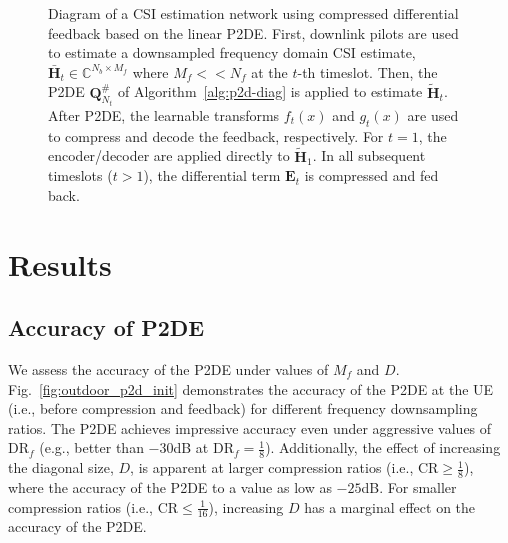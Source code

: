 \begin{figure}[!hbtp]
    \centering
    {
      \fontsize{8pt}{8pt}
      \def\svgwidth{1.0\linewidth}
      
    }
    \caption{Diagram of a CSI estimation network using compressed differential feedback based on the linear P2DE. First, downlink pilots are used to estimate a downsampled frequency domain CSI estimate, $\bar{\mathbf{H}}_t\in\mathbb{C}^{N_b \times M_f}$ where $M_f << N_f$ at the $t$-th timeslot. Then, the P2DE $\mathbf{Q}^\#_{N_t}$ of Algorithm~\ref{alg:p2d-diag} is applied to estimate $\tilde{\mathbf{H}}_t$. After P2DE, the learnable transforms $f_t(x)$ and $g_t(x)$ are used to compress and decode the feedback, respectively. For $t=1$, the encoder/decoder are applied directly to $\tilde{\mathbf{H}}_1$. In all subsequent timeslots ($t > 1$), the differential term $\mathbf{E}_t$ is compressed and fed back.}
    \label{fig:markov-p2d}
\end{figure}

\section{Results}
\label{sect:p2de-results}

\subsection{Accuracy of P2DE}

 We assess the accuracy of the P2DE under values of $M_f$ and $D$. Fig.~\ref{fig:outdoor_p2d_init} demonstrates the accuracy of the P2DE at the UE (i.e., before compression and feedback) for different frequency downsampling ratios. The P2DE achieves impressive accuracy even under aggressive values of $\text{DR}_f$ (e.g., better than $-30$dB at $\text{DR}_f=\frac 18$). Additionally, the effect of increasing the diagonal size, $D$, is apparent at larger compression ratios (i.e., $\text{CR} \geq \frac 18$), where the accuracy of the P2DE to a value as low as $-25$dB. For smaller compression ratios (i.e., $\text{CR} \leq \frac {1}{16}$), increasing $D$ has a marginal effect on the accuracy of the P2DE.

